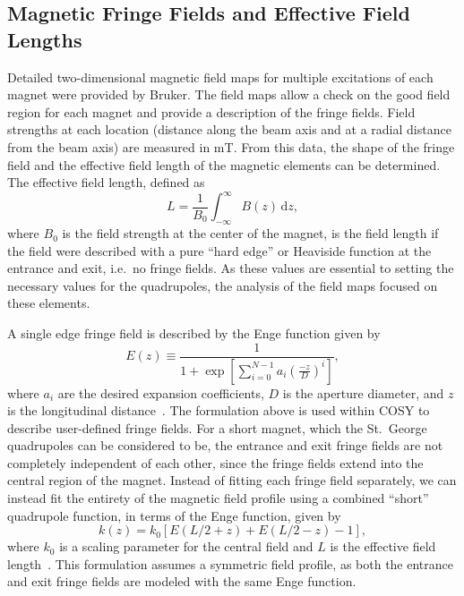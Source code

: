 \subsection{Magnetic Fringe Fields and Effective Field Lengths}

Detailed two-dimensional magnetic field maps for multiple excitations of
each magnet were provided by Bruker. The field maps allow a check on the
good field region for each magnet and provide a description of the
fringe fields. Field strengths at each location (distance along the beam
axis and at a radial distance from the beam axis) are measured in mT.
From this data, the shape of the fringe field and the effective field
length of the magnetic elements can be determined. The effective field
length, defined as
\begin{equation}
    \label{eq:efl}
    L = \frac{1}{B_0}\int_{-\infty}^{\infty} B(z)\, \textrm{d}z,
\end{equation}
where $B_0$ is the field strength at the center of the magnet, is the
field length if the field were described with a pure ``hard edge'' or
Heaviside function at the entrance and exit, i.e.\ no fringe fields. As
these values are essential to setting the necessary values for the
quadrupoles, the analysis of the field maps focused on these elements.

A single edge fringe field is described by the Enge function given by
\begin{equation}
    \label{eq:enge}
    E(z) \equiv \frac{1}{1 +
        \exp\left[\sum_{i=0}^{N-1}{a_i}(\frac{-z}{D})^{i}\right]},
\end{equation}
where $a_i$ are the desired expansion coefficients, $D$ is the aperture
diameter, and $z$ is the longitudinal distance~\cite{Baartman2007}. The
formulation above is used within COSY to describe user-defined fringe
fields. For a short magnet, which the St.\ George quadrupoles can be
considered to be, the entrance and exit fringe fields are not completely
independent of each other, since the fringe fields extend into the
central region of the magnet. Instead of fitting each fringe field
separately, we can instead fit the entirety of the magnetic field
profile using a combined ``short'' quadrupole function, in terms of the
Enge function, given by
\begin{equation}
    \label{eq:shortquad}
    k(z) = k_0\left[E(L/2 + z) + E(L/2 - z) - 1\right],
\end{equation}
where $k_0$ is a scaling parameter for the central field and $L$ is the
effective field length~\cite{Baartman2007}. This formulation assumes a
symmetric field profile, as both the entrance and exit fringe fields are
modeled with the same Enge function.

